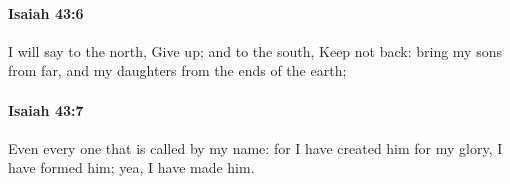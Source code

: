 		\paragraph{Isaiah 43:6} %
			\label{ISAIAH-43-6}

			I will say to the north, Give up; and to the south, Keep not back: bring my sons from far, and my daughters from the ends of the earth;


		\paragraph{Isaiah 43:7} %
			\label{ISAIAH-43-7}

			Even every one that is called by my name: for I have created him for my glory, I have formed him; yea, I have made him.


